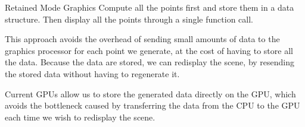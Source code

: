\documentclass[../notes.tex]{subfiles}
\begin{document}
      \begin{definition}{Retained Mode Graphics}
        Compute all the points first and store them in a data structure.
        Then display all the points through a single function call.

        This approach avoids the overhead of sending small amounts of data to the graphics
        processor for each point we generate,
        at the cost of having to store all the data.
        Because the data are stored, we can redisplay the scene, by resending the stored data
        without having to regenerate it.

        Current GPUs allow us to store the generated data directly on the GPU,
        which avoids the bottleneck caused by transferring the data from the CPU to the GPU
        each time we wish to redisplay the scene.
      \end{definition}
\end{document}
